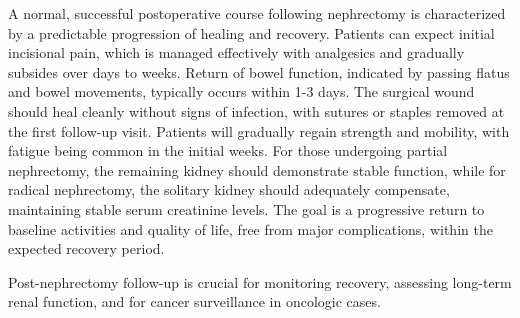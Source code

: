 A normal, successful postoperative course following nephrectomy is characterized by a predictable progression of healing and recovery. Patients can expect initial incisional pain, which is managed effectively with analgesics and gradually subsides over days to weeks. Return of bowel function, indicated by passing flatus and bowel movements, typically occurs within 1-3 days. The surgical wound should heal cleanly without signs of infection, with sutures or staples removed at the first follow-up visit. Patients will gradually regain strength and mobility, with fatigue being common in the initial weeks. For those undergoing partial nephrectomy, the remaining kidney should demonstrate stable function, while for radical nephrectomy, the solitary kidney should adequately compensate, maintaining stable serum creatinine levels. The goal is a progressive return to baseline activities and quality of life, free from major complications, within the expected recovery period.

Post-nephrectomy follow-up is crucial for monitoring recovery, assessing long-term renal function, and for cancer surveillance in oncologic cases.

